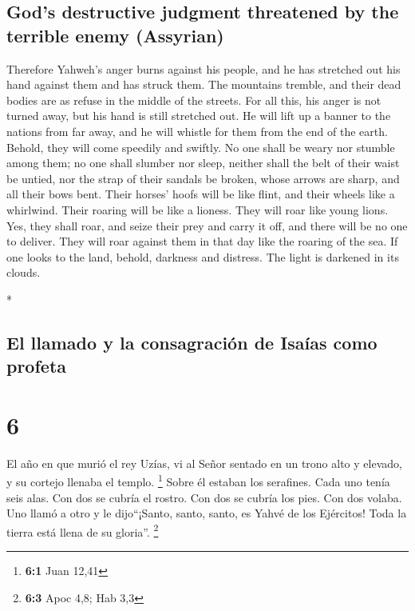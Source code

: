 \begin{paracol}{2}
\begin{otherlanguage}{english}
\hypertarget{gods-destructive-judgment-threatened-by-the-terrible-enemy-assyrian}{%
\subsection{God's destructive judgment threatened by the terrible enemy
(Assyrian)}\label{gods-destructive-judgment-threatened-by-the-terrible-enemy-assyrian}}

 Therefore Yahweh's anger burns against his people, and
he has stretched out his hand against them and has struck them. The
mountains tremble, and their dead bodies are as refuse in the middle of
the streets. For all this, his anger is not turned away, but his hand is
still stretched out.  He will lift up a banner to the
nations from far away, and he will whistle for them from the end of the
earth. Behold, they will come speedily and swiftly.  No
one shall be weary nor stumble among them; no one shall slumber nor
sleep, neither shall the belt of their waist be untied, nor the strap of
their sandals be broken,  whose arrows are sharp, and all
their bows bent. Their horses' hoofs will be like flint, and their
wheels like a whirlwind.  Their roaring will be like a
lioness. They will roar like young lions. Yes, they shall roar, and
seize their prey and carry it off, and there will be no one to deliver.
 They will roar against them in that day like the roaring
of the sea. If one looks to the land, behold, darkness and distress. The
light is darkened in its clouds.

\end{otherlanguage}

\switchcolumn[0]*

\hypertarget{el-llamado-y-la-consagraciuxf3n-de-isauxedas-como-profeta}{%
\subsection{El llamado y la consagración de Isaías como
profeta}\label{el-llamado-y-la-consagraciuxf3n-de-isauxedas-como-profeta}}

\hypertarget{section-10}{%
\section{6}\label{section-10}}

 El año en que murió el rey Uzías, vi al Señor sentado en
un trono alto y elevado, y su cortejo llenaba el templo. \footnote{\textbf{6:1}
  Juan 12,41}  Sobre él estaban los serafines. Cada uno
tenía seis alas. Con dos se cubría el rostro. Con dos se cubría los
pies. Con dos volaba.  Uno llamó a otro y le dijo``¡Santo,
santo, santo, es Yahvé de los Ejércitos! Toda la tierra está llena de su
gloria''. \footnote{\textbf{6:3} Apoc 4,8; Hab 3,3}


\end{paracol}
